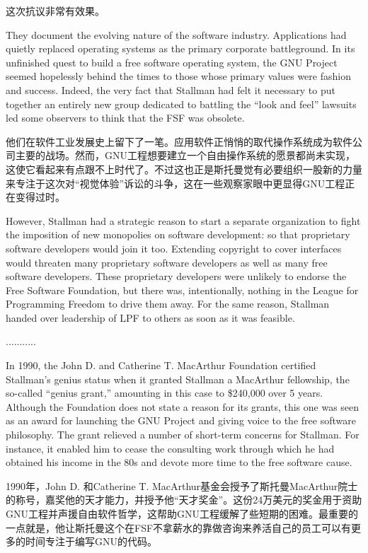 \ifdefined\chs
这次抗议非常有效果。 
\fi

\ifdefined\eng
They document the evolving nature of the software industry. Applications had quietly replaced operating systems as the primary corporate battleground. In its unfinished quest to build a free software operating system, the GNU Project seemed hopelessly behind the times to those whose primary values were fashion and success. Indeed, the very fact that Stallman had felt it necessary to put together an entirely new group dedicated to battling the ``look and feel'' lawsuits led some observers to think that the FSF was obsolete.
\fi

\ifdefined\chs
他们在软件工业发展史上留下了一笔。应用软件正悄悄的取代操作系统成为软件公司主要的战场。然而，GNU工程想要建立一个自由操作系统的愿景都尚未实现，这使它看起来有点跟不上时代了。不过这也正是斯托曼觉有必要组织一股新的力量来专注于这次对“视觉体验”诉讼的斗争，这在一些观察家眼中更显得GNU工程正在变得过时。
\fi

\ifdefined\eng
However, Stallman had a strategic reason to start a separate organization to fight the imposition of new monopolies on software development: so that proprietary software developers would join it too.  Extending copyright to cover interfaces would threaten many proprietary software developers as well as many free software developers.  These proprietary developers were unlikely to endorse the Free Software Foundation, but there was, intentionally, nothing in the League for Programming Freedom to drive them away.  For the same reason, Stallman handed over leadership of LPF to others as soon as it was feasible.
\fi

\ifdefined\chs
...........
\fi

\ifdefined\eng
In 1990, the John D. and Catherine T. MacArthur Foundation certified Stallman's genius status when it granted Stallman a MacArthur fellowship, the so-called ``genius grant,'' amounting in this case to \$240,000 over 5 years. Although the Foundation does not state a reason for its grants, this one was seen as an award for launching the GNU Project and giving voice to the free software philosophy.  The grant relieved a number of short-term concerns for Stallman.  For instance, it enabled him to cease the consulting work through which he had obtained his income in the 80s and devote more time to the free software cause.
\fi

\ifdefined\chs
1990年，John D. 和Catherine T. MacArthur基金会授予了斯托曼MacArthur院士的称号，嘉奖他的天才能力，并授予他“天才奖金”。这份24万美元的奖金用于资助GNU工程并声援自由软件哲学，这帮助GNU工程缓解了些短期的困难。最重要的一点就是，他让斯托曼这个在FSF不拿薪水的靠做咨询来养活自己的员工可以有更多的时间专注于编写GNU的代码。
\fi

